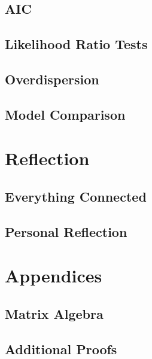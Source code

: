 \documentclass[12pt,a4paper]{report}
\begin{document}
\chapter*{AIC}

\chapter*{Likelihood Ratio Tests}

\chapter*{Overdispersion}

\chapter*{Model Comparison}

\part{Reflection}

\chapter{Everything Connected}

\chapter{Personal Reflection}

\part{Appendices}

\chapter*{Matrix Algebra}

\chapter*{Additional Proofs}
\end{document}
